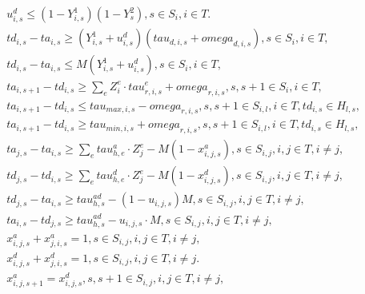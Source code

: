 \begin{align}
  & u_{i , s}^{d} \leq \left(1 - Y_{i , s}^{1}\right) \left(1 - Y_{s}^{2}\right) , s \in S_{i} , i \in T . \tag{eq\_0001} \\
  & \mathit{td}_{i , s} - \mathit{ta}_{i , s} \geq \left(Y_{i , s}^{1} + u_{i , s}^{d}\right) \left(\mathit{tau}_{d , i , s} + \mathit{omega}_{d , i , s}\right) , s \in S_{i} , i \in T , \tag{eq\_0002} \\
  & \mathit{td}_{i , s} - \mathit{ta}_{i , s} \leq M \left(Y_{i , s}^{1} + u_{i , s}^{d}\right) , s \in S_{i} , i \in T , \tag{eq\_0003} \\
  & \mathit{ta}_{i , s + 1} - \mathit{td}_{i , s} \geq \sum_{e} Z_{i}^{e} \cdot \mathit{tau}_{r , i , s}^{e} + \mathit{omega}_{r , i , s} , s , s + 1 \in S_{i} , i \in T , \tag{eq\_0004} \\
  & \mathit{ta}_{i , s + 1} - \mathit{td}_{i , s} \leq \mathit{tau}_{\mathit{max} , i , s} - \mathit{omega}_{r , i , s} , s , s + 1 \in S_{i , l} , i \in T , \mathit{td}_{i , s} \in H_{l , s} , \tag{eq\_0005} \\
  & \mathit{ta}_{i , s + 1} - \mathit{td}_{i , s} \geq \mathit{tau}_{\mathit{min} , i , s} + \mathit{omega}_{r , i , s} , s , s + 1 \in S_{i , l} , i \in T , \mathit{td}_{i , s} \in H_{l , s} , \tag{eq\_0006} \\
  & \mathit{ta}_{j , s} - \mathit{ta}_{i , s} \geq \sum_{e} \mathit{tau}_{h , e}^{a} \cdot Z_{j}^{e} - M \left(1 - x_{i , j , s}^{a}\right) , s \in S_{i , j} , i , j \in T , i \neq j , \tag{eq\_0007} \\
  & \mathit{td}_{j , s} - \mathit{td}_{i , s} \geq \sum_{e} \mathit{tau}_{h , e}^{d} \cdot Z_{j}^{e} - M \left(1 - x_{i , j , s}^{d}\right) , s \in S_{i , j} , i , j \in T , i \neq j , \tag{eq\_0008} \\
  & \mathit{td}_{j , s} - \mathit{ta}_{i , s} \geq \mathit{tau}_{h , s}^{\mathit{ad}} - \left(1 - u_{i , j , s}\right) M , s \in S_{i , j} , i , j \in T , i \neq j , \tag{eq\_0009} \\
  & \mathit{ta}_{i , s} - \mathit{td}_{j , s} \geq \mathit{tau}_{h , s}^{\mathit{ad}} - u_{i , j , s} \cdot M , s \in S_{i , j} , i , j \in T , i \neq j , \tag{eq\_0010} \\
  & x_{i , j , s}^{a} + x_{j , i , s}^{a} = 1 , s \in S_{i , j} , i , j \in T , i \neq j , \tag{eq\_0011} \\
  & x_{i , j , s}^{d} + x_{j , i , s}^{d} = 1 , s \in S_{i , j} , i , j \in T , i \neq j . \tag{eq\_0012} \\
  & x_{i , j , s + 1}^{a} = x_{i , j , s}^{d} , s , s + 1 \in S_{i , j} , i , j \in T , i \neq j , \tag{eq\_0013} \\

\end{align}

